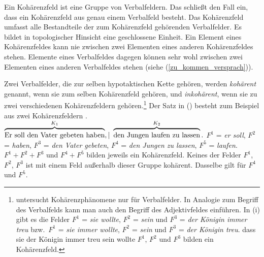 Ein Kohärenzfeld ist eine Gruppe von Verbalfeldern. Das schließt den Fall ein,
dass ein Kohärenzfeld aus genau einem Verbalfeld besteht. Das Kohärenzfeld umfasst alle Bestandteile der
zum Kohärenzfeld gehörenden Verbalfelder. Es bildet in topologischer
Hinsicht eine geschlossene Einheit. Ein Element eines Kohärenzfeldes kann nie zwischen
zwei Elementen eines anderen Kohärenzfeldes stehen. Elemente eines Verbalfeldes dagegen
können sehr wohl zwischen zwei Elementen eines anderen Verbalfeldes stehen (siehe (\ref{zu_kommen_versprach})).

Zwei Verbalfelder, die zur selben hypotaktischen Kette gehören, werden \emph{kohärent} genannt,%
wenn sie zum selben Kohärenzfeld gehören, und \emph{inkohärent},%
wenn sie zu zwei verschiedenen Kohärenzfeldern gehören.\footnote{
        \citeauthor{Bech55a} untersucht Kohärenzphänomene nur für Verbalfelder.
        In Analogie zum Begriff des Verbalfelds kann man
        auch den Begriff des Adjektivfeldes
        einführen.
        In (i) gibt es die Felder $F^1$ = \emph{sie wollte}, $F^2$ = \emph{sein} und
        $F^3$ = \emph{der Königin immer treu} bzw.\ $F^1$ = \emph{sie immer wollte}, $F^2$ = \emph{sein} und
        $F^3$ = \emph{der Königin treu}.
        \ea
        dass sie der Königin immer treu sein wollte
        \z
        $F^1$, $F^2$ und $F^3$ bilden ein Kohärenzfeld.
}
Der Satz in () besteht zum Beispiel aus zwei Kohärenzfeldern \citep[\S 58]{Bech55a}.
\ea
${\overbrace{\rule{0cm}{2ex}{\textrm{Er~soll~den~Vater~gebeten~haben}}
                 }^{K_1},|~ 
      \overbrace{\rule{0cm}{2ex}{\textrm{den~Jungen~laufen~zu~lassen}}
                }^{K_2}.}$
\z
$F^1$ = \emph{er soll}, $F^2$ = \emph{haben}, $F^3$ = \emph{den Vater gebeten},
$F^4$ = \emph{den Jungen zu lassen}, $F^5$ = \emph{laufen}. $F^1 + F^2 + F^3$ und $F^4 + F^5$
bilden jeweils ein Kohärenzfeld. Keines der Felder $F^1$, $F^2$, $F^3$ ist mit einem Feld
außerhalb dieser Gruppe kohärent. Dasselbe gilt für $F^4$ und $F^5$.

